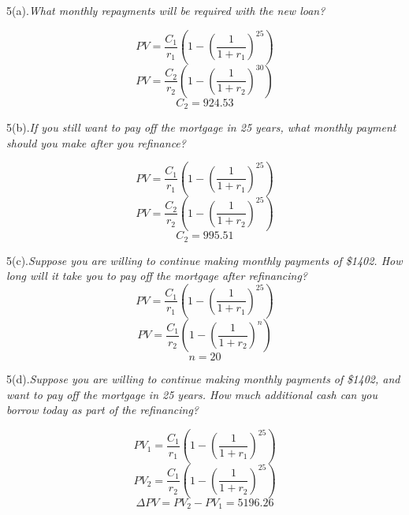 \documentclass[10pt, a4paper]{article}
\begin{document}
5(a).\emph{What monthly repayments will be required with the new loan?}

$$PV = \frac{C_1}{r_1}(1 - (\frac{1}{1 + r_1})^{25})$$
$$PV = \frac{C_2}{r_2}(1 - (\frac{1}{1 + r_2})^{30})$$
$$C_2 = 924.53$$

5(b).\emph{If you still want to pay off the mortgage in 25 years, what monthly payment should you make after you refinance?}

$$PV = \frac{C_1}{r_1}(1 - (\frac{1}{1 + r_1})^{25})$$
$$PV = \frac{C_2}{r_2}(1 - (\frac{1}{1 + r_2})^{25})$$
$$C_2 = 995.51$$

5(c).\emph{Suppose you are willing to continue making monthly payments of \$1402. How long will it take you to pay off the mortgage after refinancing?}
$$PV = \frac{C_1}{r_1}(1 - (\frac{1}{1 + r_1})^{25})$$
$$PV = \frac{C_1}{r_2}(1 - (\frac{1}{1 + r_2})^{n})$$
$$n = 20$$

5(d).\emph{Suppose you are willing to continue making monthly payments of \$1402, and want to pay off the mortgage in 25 years. How much additional cash can you borrow today as part of the refinancing?}

$$PV_1 = \frac{C_1}{r_1}(1 - (\frac{1}{1 + r_1})^{25})$$
$$PV_2 = \frac{C_1}{r_2}(1 - (\frac{1}{1 + r_2})^{25})$$
$$\Delta PV = PV_2 - PV_1 = 5196.26$$
\end{document}
